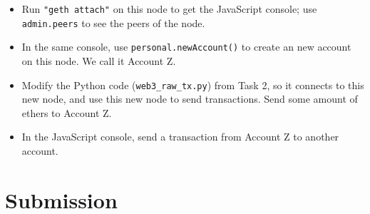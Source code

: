 \begin{itemize}
\item Run \texttt{"geth attach"} on this node to get the JavaScript console;
use \texttt{admin.peers} to see the peers of the node.  

\item In the same console, 
use \texttt{personal.newAccount()} to create an new account on this node. 
We call it Account Z. 

\item Modify the Python code (\texttt{web3\_raw\_tx.py}) from Task 2, so it 
connects to this new node, and use this new node to send transactions. 
Send some amount of ethers to Account Z. 

\item In the JavaScript console, send a transaction
from Account Z to another account. 
\end{itemize}
 

\section{Submission}

\seedsubmission






